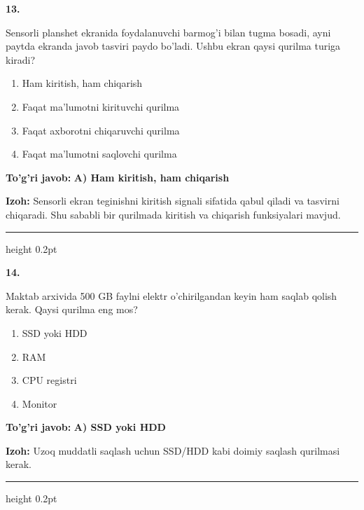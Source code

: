 \documentclass[10pt,a4paper]{article}
\begin{document}
{\bfseries\sffamily\color{ink} 13.}
\par
Sensorli planshet ekranida foydalanuvchi barmog'i bilan tugma bosadi, ayni paytda ekranda javob tasviri paydo bo'ladi. Ushbu ekran qaysi qurilma turiga kiradi?
\begin{enumerate}[label=\Alph*),leftmargin=9mm]
\item Ham kiritish, ham chiqarish
\item Faqat ma'lumotni kirituvchi qurilma
\item Faqat axborotni chiqaruvchi qurilma
\item Faqat ma'lumotni saqlovchi qurilma
\end{enumerate}
\begin{tcolorbox}[enhanced,breakable,colback=teal!4,colframe=teal!60!black,boxrule=0.45pt,arc=1.2mm,left=2.7mm,right=2.7mm,top=1.8mm,bottom=1.8mm,before skip=2mm,after skip=2mm]
{\bfseries\sffamily\color{teal}To'g'ri javob:} \textbf{A) Ham kiritish, ham chiqarish}
\par\smallskip
{\bfseries Izoh:} Sensorli ekran teginishni kiritish signali sifatida qabul qiladi va tasvirni chiqaradi. Shu sababli bir qurilmada kiritish va chiqarish funksiyalari mavjud.
\end{tcolorbox}
\vspace{2mm}\hrule height 0.2pt\vspace{3mm}

{\bfseries\sffamily\color{ink} 14.}
\par
Maktab arxivida 500 GB faylni elektr o'chirilgandan keyin ham saqlab qolish kerak. Qaysi qurilma eng mos?
\begin{enumerate}[label=\Alph*),leftmargin=9mm]
\item SSD yoki HDD
\item RAM
\item CPU registri
\item Monitor
\end{enumerate}
\begin{tcolorbox}[enhanced,breakable,colback=teal!4,colframe=teal!60!black,boxrule=0.45pt,arc=1.2mm,left=2.7mm,right=2.7mm,top=1.8mm,bottom=1.8mm,before skip=2mm,after skip=2mm]
{\bfseries\sffamily\color{teal}To'g'ri javob:} \textbf{A) SSD yoki HDD}
\par\smallskip
{\bfseries Izoh:} Uzoq muddatli saqlash uchun SSD/HDD kabi doimiy saqlash qurilmasi kerak.
\end{tcolorbox}
\vspace{2mm}\hrule height 0.2pt\vspace{3mm}
\end{document}
